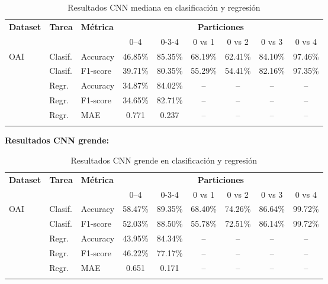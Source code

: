 \begin{table}[h]
    \centering
    \caption{Resultados CNN mediana en clasificación y regresión}
    \label{tab:cnn_mediana_results}
    \begin{tabular}{@{} l l l c c c c c c @{}} 
      \toprule
      \textbf{Dataset} & \textbf{Tarea} & \textbf{Métrica} 
        & \multicolumn{6}{c}{\textbf{Particiones}} \\
      \cmidrule(lr){4-9}
      & & & 0--4 & 0-3-4 & 0 vs 1 & 0 vs 2 & 0 vs 3 & 0 vs 4 \\
      \midrule
      \multirow{2}{*}{OAI}
        & Clasif. & Accuracy   & 46.85\% & 85.35\% & 68.19\% & 62.41\% & 84.10\% & 97.46\% \\
        & Clasif. & F1-score   & 39.71\% & 80.35\% & 55.29\% & 54.41\% & 82.16\% & 97.35\% \\
      \addlinespace
      \multirow{3}{*}{OAI}
        & Regr.   & Accuracy   & 34.87\% & 84.02\% & -- & -- & -- & -- \\
        & Regr.   & F1-score   & 34.65\% & 82.71\% & -- & -- & -- & -- \\
        & Regr.   & MAE        & 0.771 & 0.237 & -- & -- & -- & -- \\
      \addlinespace
    \end{tabular}
\end{table}

\textbf{Resultados CNN grende:}
 
\begin{table}[h]
    \centering
    \caption{Resultados CNN grende en clasificación y regresión}
    \label{tab:cnn_grande_results}
    \begin{tabular}{@{} l l l c c c c c c @{}} 
      \toprule
      \textbf{Dataset} & \textbf{Tarea} & \textbf{Métrica} 
        & \multicolumn{6}{c}{\textbf{Particiones}} \\
      \cmidrule(lr){4-9}
      & & & 0--4 & 0-3-4 & 0 vs 1 & 0 vs 2 & 0 vs 3 & 0 vs 4 \\
      \midrule
      \multirow{2}{*}{OAI}
        & Clasif. & Accuracy   & 58.47\% & 89.35\% & 68.40\% & 74.26\% & 86.64\% & 99.72\% \\
        & Clasif. & F1-score   & 52.03\% & 88.50\% & 55.78\% & 72.51\% & 86.14\% & 99.72\% \\
      \addlinespace
      \multirow{3}{*}{OAI}
        & Regr.   & Accuracy   & 43.95\% & 84.34\% & -- & -- & -- & -- \\
        & Regr.   & F1-score   & 46.22\% & 77.17\% & -- & -- & -- & -- \\
        & Regr.   & MAE        & 0.651 & 0.171 & -- & -- & -- & -- \\
      \addlinespace
    \end{tabular}
\end{table}


